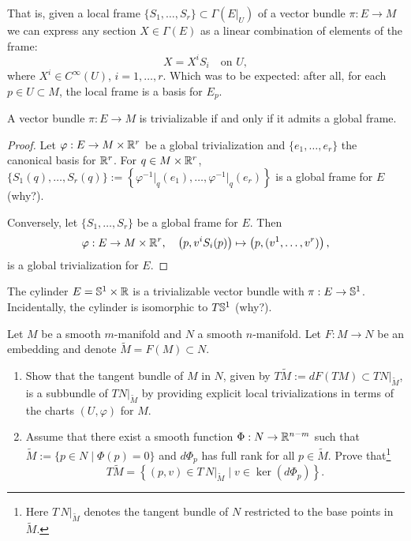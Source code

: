 That is, given a local frame $\{S_1, \ldots, S_r\}\subset\Gamma(E|_U)$ of a vector bundle $\pi: E \to M$ we can express any section $X\in\Gamma(E)$ as a linear combination of elements of the frame:
\begin{equation}
	X = X^i S_i \quad\mbox{on }U,
\end{equation}
where $X^i\in C^\infty(U)$, $i=1,\ldots,r$.
Which was to be expected: after all, for each $p\in U\subset M$, the local frame is a basis for $E_p$.

\begin{proposition}\label{prop:trivializable}
	A vector bundle $\pi: E\to M$ is trivializable if and only if it admits a global frame.
\end{proposition}
\begin{proof}
	Let $\varphi: E \to M\times\mathbb{R}^r$ be a global trivialization and $\{e_1, \ldots, e_r\}$ the canonical basis for $\mathbb{R}^r$.
	For $q\in M\times\mathbb{R}^r$, $\{S_1(q), \ldots, S_r(q)\} := \left\{\varphi^{-1}\big|_q(e_1), \ldots, \varphi^{-1}\big|_q(e_r) \right\}$ is a global frame for $E$ (why?).

	Conversely, let $\{S_1, \ldots, S_r\}$ be a global frame for $E$. Then
	\begin{equation}
		\varphi: E \to M\times\mathbb{R}^r, \quad
		\left(p, v^i S_i(p)\right) \mapsto \left(p, (v^1, \ldots, v^r)\right),
	\end{equation}
	is a global trivialization for $E$.
\end{proof}

\begin{example}
	The cylinder $E = \mathbb{S}^1\times\mathbb{R}$ is a trivializable vector bundle with $\pi:E\to \mathbb{S}^1$.
	Incidentally, the cylinder is isomorphic to $T\mathbb{S}^1$ (why?).
\end{example}

\begin{exercise}
	Let $M$ be a smooth $m$-manifold and $N$ a smooth $n$-manifold.
	Let $F:M\to N$ be an embedding and denote $\widetilde M = F(M)\subset N$.
	\begin{enumerate}
		\item Show that the tangent bundle of $M$ in $N$, given by $T\widetilde M := dF(TM) \subset TN\big|_{\widetilde M}$, is a subbundle of $TN\big|_{\widetilde M}$ by providing explicit local trivializations in terms of the charts $(U, \varphi)$ for $M$.
		\item Assume that there exist a smooth function $\Phi:N\to\mathbb{R}^{n-m}$ such that $\widetilde M := \{p\in N \mid \Phi(p) = 0\}$ and $d\Phi_p$ has full rank for all $p\in\widetilde M$. Prove that\footnote{Here $T\,N|_{\widetilde{M}}$ denotes the tangent bundle of $N$ restricted to the base points in $\widetilde{M}$.}
		      \begin{equation}
			      T\widetilde{M} = \left\{(p,v)\in T\,N|_{\widetilde{M}} \mid v\in\ker(d\Phi_p)\right\}.
		      \end{equation}
	\end{enumerate}
\end{exercise}
